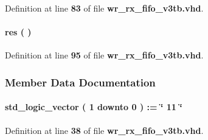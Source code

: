 Definition at line {\bf 83} of file {\bf wr\+\_\+rx\+\_\+fifo\+\_\+v3tb.\+vhd}.

\paragraph[{res}]{\setlength{\rightskip}{0pt plus 5cm} {\bfseries \textcolor{vhdlchar}{ }} res ( ) \hspace{0.3cm}{\ttfamily [Process]}}\label{classwr__rx__fifo__v3tb_1_1tb__behave_ab0bd7560790c13b656fd58e17e35143e}


Definition at line {\bf 95} of file {\bf wr\+\_\+rx\+\_\+fifo\+\_\+v3tb.\+vhd}.



\subsubsection{Member Data Documentation}
\paragraph[{ch\+\_\+en}]{ {\bfseries \textcolor{comment}{std\+\_\+logic\+\_\+vector}\textcolor{vhdlchar}{ }\textcolor{vhdlchar}{(}\textcolor{vhdlchar}{ }\textcolor{vhdlchar}{ } \textcolor{vhdldigit}{1} \textcolor{vhdlchar}{ }\textcolor{keywordflow}{downto}\textcolor{vhdlchar}{ }\textcolor{vhdlchar}{ } \textcolor{vhdldigit}{0} \textcolor{vhdlchar}{ }\textcolor{vhdlchar}{)}\textcolor{vhdlchar}{ }\textcolor{vhdlchar}{ }\textcolor{vhdlchar}{ }\textcolor{vhdlchar}{\+:}\textcolor{vhdlchar}{=}\textcolor{vhdlchar}{ }\textcolor{vhdlchar}{ }\textcolor{vhdlchar}{ }\textcolor{vhdlchar}{ }\textcolor{keyword}{\char`\"{} 11 \char`\"{}}\textcolor{vhdlchar}{ }} \hspace{0.3cm}{\ttfamily [Signal]}}\label{classwr__rx__fifo__v3tb_1_1tb__behave_a1e134c20b9493590d25b7099d98704b4}


Definition at line {\bf 38} of file {\bf wr\+\_\+rx\+\_\+fifo\+\_\+v3tb.\+vhd}.

